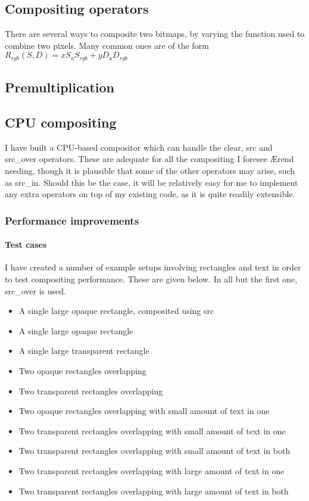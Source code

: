 \documentclass[12pt]{article}
\begin{document}
   \subsection{Compositing operators}
    There are several ways to composite two bitmaps, by varying the function used to combine two pixels. Many common ones are of the form $R_{rgb}(S,D) = xS_{a}S_{rgb}+yD_{a}D_{rgb}$
   \subsection{Premultiplication}
    
  \subsection{CPU compositing}
   I have built a CPU-based compositor which can handle the \textsf{clear}, \textsf{src} and \textsf{src_over} operators. These are adequate for all the compositing I foresee \AE{}rend needing, though it is plausible that some of the other operators may arise, such as \textsf{src_in}. Should this be the case, it will be relatively easy for me to implement any extra operators on top of my existing code, as it is quite readily extensible.


   \subsubsection{Performance improvements}
    \paragraph{Test cases} I have created a number of example setups involving rectangles and text in order to test compositing performance. These are given below. In all but the first one, \textsf{src_over} is used.
    \begin{itemize}
     \item A single large opaque rectangle, composited using \textsf{src}
     \item A single large opaque rectangle
     \item A single large transparent rectangle
     \item Two opaque rectangles overlapping
     \item Two transparent rectangles overlapping
     \item Two opaque rectangles overlapping with small amount of text in one
     \item Two transparent rectangles overlapping with small amount of text in one
     \item Two transparent rectangles overlapping with small amount of text in both
     \item Two transparent rectangles overlapping with large amount of text in one
     \item Two transparent rectangles overlapping with large amount of text in both
    \end{itemize}
\end{document}
